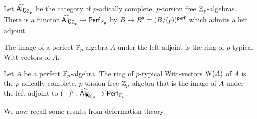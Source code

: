 \begin{theorem}\label{thm: functor from AlgZp hat to PerfFp}
    Let $\widehat{\mathsf{Alg}}_{\mathbb{Z}_{p}}$ be the category of $p$-adically complete, $p$-torsion free $\mathbb{Z}_{p}$-algebras. There is a functor $\widehat{\mathsf{Alg}}_{\mathbb{Z}_{p}}\to\mathsf{Perf}_{\mathbb{F}_{p}}$ by $B\mapsto B^{\flat}=(B/(p))^{\mathsf{perf}}$ which admits a left adjoint. 
\end{theorem}
The image of a perfect $\mathbb{F}_{p}$-algebra $A$ under the left adjoint is the ring of $p$-typical Witt vectors of $A$. 
\begin{definition}\label{def: Witt vectors}
    Let $A$ be a perfect $\mathbb{F}_{p}$-algebra. The ring of $p$-typical Witt-vectors $\mathrm{W}(A)$ of $A$ is the $p$-adically complete, $p$-torsion free $\mathbb{Z}_{p}$-algebra that is the image of $A$ under the left adjoint to $(-)^{\flat}:\widehat{\mathsf{Alg}}_{\mathbb{Z}_{p}}\to\mathsf{Perf}_{\mathbb{F}_{p}}$. 
\end{definition}
We now recall some results from deformation theory. 

